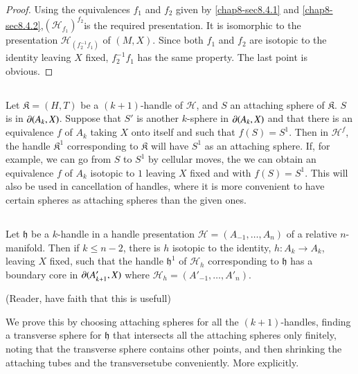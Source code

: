 \begin{proof}
Using the equivalences $f_{1}$ and $f_{2}$ given by \ref{chap8-sec8.4.1} and \ref{chap8-sec8.4.2},\break $(\mathscr{H}_{f_{1}})^{f_{2}}$\pageoriginale is the required presentation. It is isomorphic to the presentation $\mathscr{H}_{(f^{-1}_{2}f_{1})}$ of $(M,X)$. Since both $f_{1}$ and $f_{2}$ are isotopic to the identity leaving $X$ fixed, $f^{-1}_{2}f_{1}$ has the same property. The last point is obvious.
\end{proof}

\setcounter{subsection}{3}
\subsection{}\label{chap8-sec8.4.4}
Let $\mathfrak{K}=(H,T)$ be a $(k+1)$-handle of $\mathscr{H}$, and $S$ an attaching sphere of $\mathfrak{K}$. $S$ is in $\partial (A_{k},X)$. Suppose that $S'$ is another $k$-sphere in $\partial (A_{k},X)$ and that there is an equivalence $f$ of $A_{k}$ taking $X$ onto itself and such that $f(S)=S^{1}$. Then in $\mathscr{H}^{f}$, the handle $\mathfrak{K}^{1}$ corresponding to $\mathfrak{K}$ will have $S^{1}$ as an attaching sphere. If, for example, we can go from $S$ to $S^{1}$ by cellular moves, the we can obtain an equivalence $f$ of $A_{k}$ isotopic to $1$ leaving
$X$ fixed and with $f(S)=S^{1}$. This will also be used in cancellation of handles, where it is more convenient to have certain spheres as attaching spheres than the given ones.

\subsection{}\label{chap8-sec8.4.5}
Let $\mathfrak{h}$ be a $k$-handle in a handle presentation $\mathscr{H}=(A_{-1},\ldots,A_{n})$ of a relative $n$-manifold. Then if $k\leq n-2$, there is $h$ isotopic to the identity, $h:A_{k}\to A_{k}$, leaving $X$ fixed, such that the handle $\mathfrak{h}^{1}$ of $\mathscr{H}_{h}$ corresponding to $\mathfrak{h}$ has a boundary core in $\partial(A'_{k+1},X)$ where $\mathscr{H}_{h}=(A'_{-1},\ldots,A'_{n})$.

(Reader, have faith that this is usefull)

We prove this by choosing attaching spheres for all the $(k+1)$-handles, finding a transverse sphere for $\mathfrak{h}$ that intersects all the attaching spheres only finitely, noting that the transverse sphere contains other points, and then shrinking the attaching tubes and the transverse\pageoriginale tube conveniently. More explicitly.

